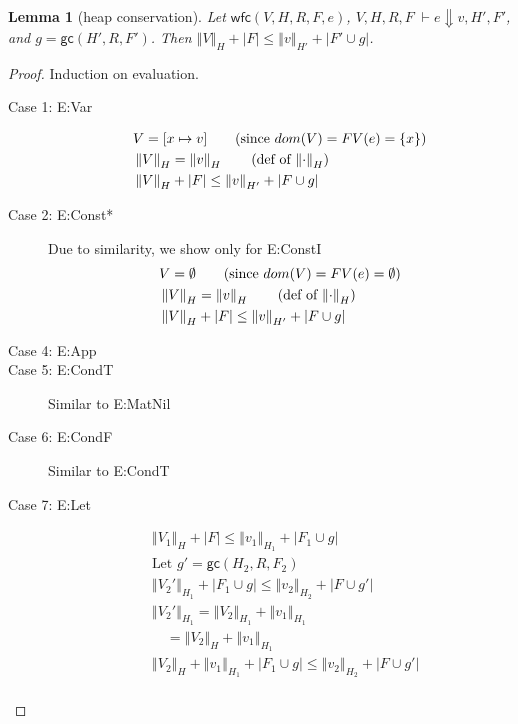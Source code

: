 \documentclass[11pt]{article}
\newcommand{\ssize}[2]{\left\Vert #2 \right\Vert_{#1}}
\newcommand{\gc}[3]{\mathsf{gc}(#1,#2,#3)}
\newcommand{\wfc}[5]{\mathsf{wfc}(#1,#2,#3,#4,#5)}
\newtheorem{lemma}[theorem]{Lemma}
\theoremstyle{definition}
\begin{document}
\iffalse
\begin{lemma}[heap conservation]
Let $\wfc{V}{H}{R}{F}{e}$, $V,H,R,F \; \vdash e \Downarrow v, H', F'$, and $g = \gc{H'}{R}{F'}$. 
Then $\ssize{H}{V} + |F| \le \ssize{H'}{v} + |F' \cup g|$.
\end{lemma}

\begin{proof}
Induction on evaluation.\\
\begin{description}
  \item[Case 1: E:Var]
  \begin{align*}
  &V = [x \mapsto v] \tag{since $dom(V) = FV(e) = \{x\}$}\\
  &\ssize{H}{V} = \ssize{H}{v} \tag{def of $\ssize{H}{\cdot}$}\\
  &\ssize{H}{V} + |F| \le \ssize{H'}{v} + |F \cup g|\\
  \end{align*}
  \item[Case 2: E:Const*]
  Due to similarity, we show only for E:ConstI
  \begin{align*}
  &V = \emptyset \tag{since $dom(V) = FV(e) = \emptyset$}\\
  &\ssize{H}{V} = \ssize{H}{v} \tag{def of $\ssize{H}{\cdot}$}\\
  &\ssize{H}{V} + |F| \le \ssize{H'}{v} + |F \cup g|\\
  \end{align*}
  \item[Case 4: E:App]
  \item[Case 5: E:CondT] Similar to E:MatNil
  \item[Case 6: E:CondF] Similar to E:CondT
  \item [Case 7: E:Let]
  \begin{align*}
  &\ssize{H}{V_1} + |F| \le \ssize{H_1}{v_1} + |F_1 \cup g| \tag{IH on first premise}\\ 
  &\text{Let } g' = \gc{H_2}{R}{F_2}\\
  &\ssize{H_1}{V_2'} + |F_1 \cup g| \le \ssize{H_2}{v_2} + |F \cup g'| \tag{IH on second premise}\\
  &\ssize{H_1}{V_2'} = \ssize{H_1}{V_2} + \ssize{H_1}{v_1} \tag{definition of semantic size}\\
  &\quad = \ssize{H}{V_2} + \ssize{H_1}{v_1} \tag{main lemma}\\
  &\ssize{H}{V_2} + \ssize{H_1}{v_1} + |F_1 \cup g| \le \ssize{H_2}{v_2} + |F \cup g'|\\

\end{align*}
\end{description}
\end{proof}
\end{document}
